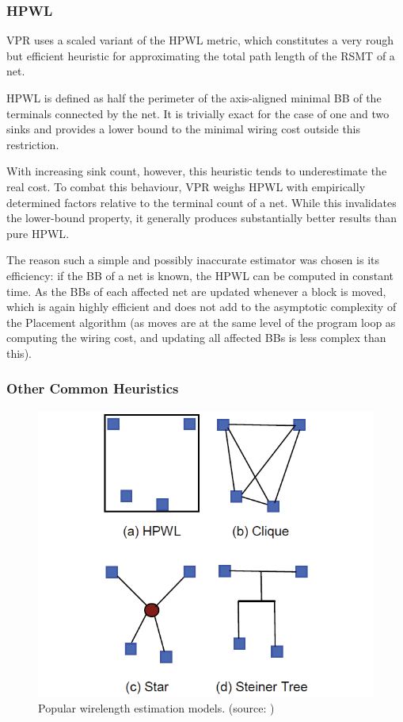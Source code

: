 \subsubsection{\gls{HPWL}}

\gls{VPR} uses a scaled variant of the \gls{HPWL} metric, which constitutes a very rough but efficient heuristic for approximating the total path length of the \gls{RSMT} of a net.

\gls{HPWL} is defined as half the perimeter of the axis-aligned minimal \gls{BB} of the terminals connected by the net. It is trivially exact for the case of one and two sinks and provides a lower bound to the minimal wiring cost outside this restriction. 

With increasing sink count, however, this heuristic tends to underestimate the real cost. To combat this behaviour, \gls{VPR} weighs \gls{HPWL} with empirically determined factors relative to the terminal count of a net. While this invalidates the lower-bound property, it generally produces substantially better results than pure \gls{HPWL}.

The reason such a simple and possibly inaccurate estimator was chosen is its efficiency: if the \gls{BB} of a net is known, the \gls{HPWL} can be computed in constant time. As the \glspl{BB} of each affected net are updated whenever a block is moved, which is again highly efficient and does not add to the asymptotic complexity of the Placement algorithm (as moves are at the same level of the program loop as computing the wiring cost, and updating all affected \glspl{BB} is less complex than this).

\subsubsection{Other Common Heuristics}

\begin{figure}
	\includegraphics[width=\textwidth]{plots/wirelength-estimation-models.png}
	\caption{Popular wirelength estimation models. (source: \cite{star-plus-paper})}
	\label{fig:wirelength-estimation-models}
\end{figure}

